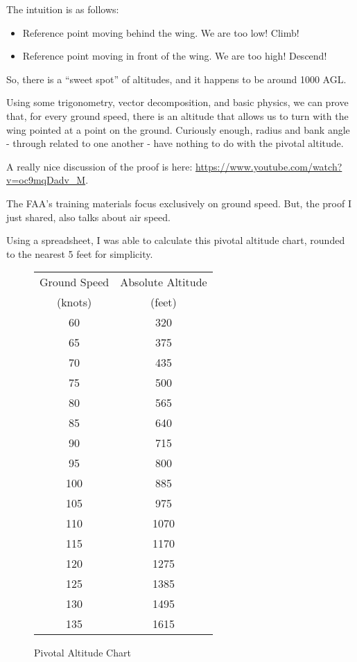The intuition is as follows:

\begin{itemize}
    \item Reference point moving behind the wing. We are too low! Climb!
    \item Reference point moving in front of the wing. We are too high! Descend!
\end{itemize}

So, there is a ``sweet spot'' of altitudes, and it happens to be around 1000 AGL.

Using some trigonometry, vector decomposition, and basic physics, we can prove that, for every ground speed, there is an altitude that allows us to turn with the wing pointed at a point on the ground. Curiously enough, radius and bank angle - through related to one another - have nothing to do with the pivotal altitude.

A really nice discussion of the proof is here: \url{https://www.youtube.com/watch?v=oc9mqDadv\_M}.

The FAA's training materials focus exclusively on ground speed. But, the proof I just shared, also talks about air speed.

Using a spreadsheet, I was able to calculate this pivotal altitude chart, rounded to the nearest 5 feet for simplicity.

\begin{figure}
\begin{center}
\begin{tabular}{ |c|c| }
    \hline
    Ground Speed & Absolute Altitude \\
    (knots) & (feet) \\
    \hline
     60 &  320 \\
     65 &  375 \\
    \hline
     70 &  435 \\
     75 &  500 \\
    \hline
     80 &  565 \\
     85 &  640 \\
    \hline
     90 &  715 \\
     95 &  800 \\
    \hline
    100 &  885 \\
    105 &  975 \\
    \hline
    110 & 1070 \\
    115 & 1170 \\
    \hline
    120 & 1275 \\
    125 & 1385 \\
    \hline
    130 & 1495 \\
    135 & 1615 \\
    \hline
\end{tabular}
\end{center}
\caption{Pivotal Altitude Chart}
\end{figure}

